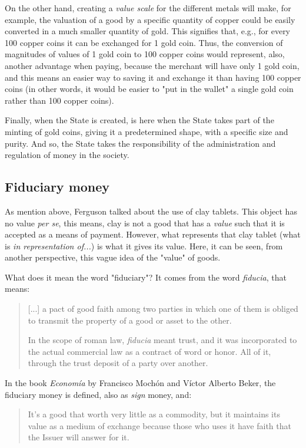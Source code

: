 \documentclass[12pt,a4paper,twoside]{book}
\begin{document}
On the other hand, creating a \textit{value scale} for the different metals will make, for example, the valuation of a good by a specific quantity of copper could be easily converted in a much smaller quantity of gold. This signifies that, e.g., for every 100 copper coins it can be exchanged for 1 gold coin. Thus, the conversion of magnitudes of values of 1 gold coin to 100 copper coins would represent, also, another advantage when paying, because the merchant will have only 1 gold coin, and this means an easier way to saving it and exchange it than having 100 copper coins (in other words, it would be easier to "put in the wallet" a single gold coin rather than 100 copper coins).

Finally, when the State is created, is here when the State takes part of the minting of gold coins, giving it a predetermined shape, with a specific size and purity. And so, the State takes the responsibility of the administration and regulation of money in the society.

\subsection{Fiduciary money}
As mention above, Ferguson talked about the use of clay tablets. This object has no value \textit{per se}, this means, clay is not a good that has a \textit{value} such that it is accepted as a means of payment. However, what represents that clay tablet (what is \textit{in representation of...}) is what it gives its value. Here, it can be seen, from another perspective, this vague idea of the "value" of goods.

What does it mean the word "fiduciary"? It comes from the word \textit{fiducia}, that means:

\begin{quotation}
[...] a pact of good faith among two parties in which one of them is obliged to transmit the property of a good or asset to the other.

In the scope of roman law, \textit{fiducia} meant trust, and it was incorporated to the actual commercial law as a contract of word or honor. All of it, through the trust deposit of a party over another. \cite{epedia:fiducia}
\end{quotation}

In the book \textit{Economía} by Francisco Mochón and Víctor Alberto Beker, the fiduciary money is defined, also as \textit{sign} money, and:

\begin{quote}
It's a good that worth very little as a commodity, but it maintains its value as a medium of exchange because those who uses it have faith that the Issuer will answer for it. \cite[p. 265]{mochobeker}
\end{quote}
\end{document}
